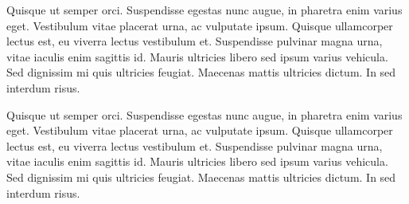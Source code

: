 

Quisque ut semper orci. Suspendisse egestas nunc augue, in pharetra enim varius eget. Vestibulum vitae placerat urna, ac vulputate ipsum. Quisque ullamcorper lectus est, eu viverra lectus vestibulum et. Suspendisse pulvinar magna urna, vitae iaculis enim sagittis id. Mauris ultricies libero sed ipsum varius vehicula. Sed dignissim mi quis ultricies feugiat. Maecenas mattis ultricies dictum. In sed interdum risus.

Quisque ut semper orci. Suspendisse egestas nunc augue, in pharetra enim varius eget. Vestibulum vitae placerat urna, ac vulputate ipsum. Quisque ullamcorper lectus est, eu viverra lectus vestibulum et. Suspendisse pulvinar magna urna, vitae iaculis enim sagittis id. Mauris ultricies libero sed ipsum varius vehicula. Sed dignissim mi quis ultricies feugiat. Maecenas mattis ultricies dictum. In sed interdum risus.